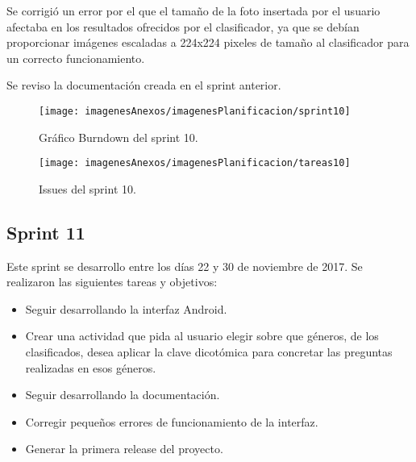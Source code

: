 Se corrigió un error por el que el tamaño de la foto insertada por el usuario afectaba en los resultados ofrecidos por el clasificador, ya que se debían proporcionar imágenes escaladas a 224x224 pixeles de tamaño al clasificador para un correcto funcionamiento.

Se reviso la documentación creada en el sprint anterior.

\begin{figure}[h]
    \begin{center}%
        \begin{center}%
          \texttt{[image: imagenesAnexos/imagenesPlanificacion/sprint10]}%
          \caption{Gráfico Burndown del sprint 10.}%
          \label{figSprint10}%
        \end{center}%
  	\end{center}%
\end{figure}%

\begin{figure}[h]
    \begin{center}%
        \begin{center}%
          \texttt{[image: imagenesAnexos/imagenesPlanificacion/tareas10]}%
          \caption{Issues del sprint 10.}%
          \label{figTareas10}%
        \end{center}%
  	\end{center}%
\end{figure}%

\newpage

\subsection{Sprint 11}

Este sprint se desarrollo entre los días 22 y 30 de noviembre de 2017. Se realizaron las siguientes tareas y objetivos:

\begin{itemize}
	\item Seguir desarrollando la interfaz Android.
	\item Crear una actividad que pida al usuario elegir sobre que géneros, de los clasificados, desea aplicar la clave dicotómica para concretar las preguntas realizadas en esos géneros.
	\item Seguir desarrollando la documentación.
	\item Corregir pequeños errores de funcionamiento de la interfaz.
	\item Generar la primera release del proyecto.
\end{itemize}

